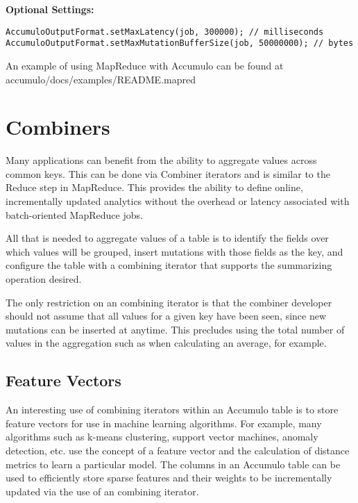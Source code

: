 \Large
\textbf{Optional Settings:}
\normalsize

\begingroup\fontsize{8pt}{8pt}\selectfont\begin{verbatim}
AccumuloOutputFormat.setMaxLatency(job, 300000); // milliseconds
AccumuloOutputFormat.setMaxMutationBufferSize(job, 50000000); // bytes
\end{verbatim}\endgroup

An example of using MapReduce with Accumulo can be found at\\
accumulo/docs/examples/README.mapred

\section{Combiners}

Many applications can benefit from the ability to aggregate values across common
keys. This can be done via Combiner iterators and is similar to the Reduce step in
MapReduce. This provides the ability to define online, incrementally updated
analytics without the overhead or latency associated with batch-oriented
MapReduce jobs.

All that is needed to aggregate values of a table is to identify the fields over which
values will be grouped, insert mutations with those fields as the key, and configure
the table with a combining iterator that supports the summarizing operation
desired.

The only restriction on an combining iterator is that the combiner developer
should not assume that all values for a given key have been seen, since new
mutations can be inserted at anytime. This precludes using the total number of
values in the aggregation such as when calculating an average, for example.

\subsection{Feature Vectors}

An interesting use of combining iterators within an Accumulo table is to store
feature vectors for use in machine learning algorithms. For example, many
algorithms such as k-means clustering, support vector machines, anomaly detection,
etc. use the concept of a feature vector and the calculation of distance metrics to
learn a particular model. The columns in an Accumulo table can be used to efficiently
store sparse features and their weights to be incrementally updated via the use of an
combining iterator.

